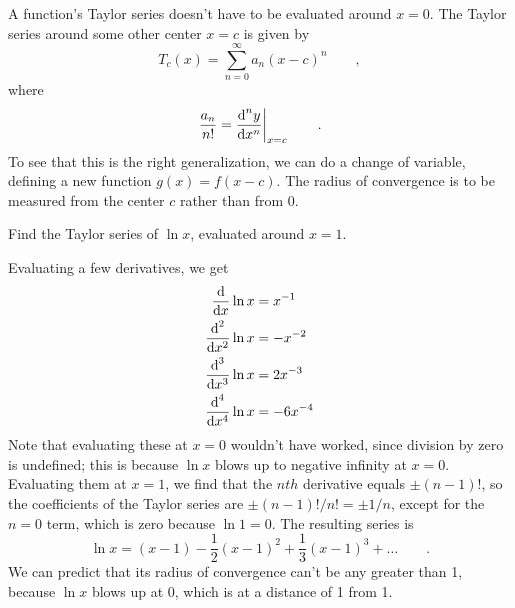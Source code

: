 A function's Taylor series doesn't have to be evaluated around $x=0$. The Taylor series around some other
center $x=c$ is given by
\begin{equation*}
  T_c(x) = \sum_{n=0}^\infty a_n (x-c)^n \qquad ,
\end{equation*}
where 
\begin{equation*}
  \left. \frac{a_n}{n!} = \frac{\textup{d}^n y}{\textup{d} x^n}\right|_{x=c} \qquad .
\end{equation*}
To see that this is the right generalization, we can do a change of variable,
defining a new function $g(x)=f(x-c)$. The radius of convergence is to be measured
from the center $c$ rather than from 0.

\begin{eg}
\egquestion
Find the Taylor series of $\ln x$, evaluated around $x=1$.

\eganswer
Evaluating a few derivatives, we get
\begin{align*}
  \frac{\textup{d}}{\textup{d} x}\ln x &= x^{-1} \\
  \frac{\textup{d}^2}{\textup{d} x^2}\ln x &= -x^{-2}\\
  \frac{\textup{d}^3}{\textup{d} x^3}\ln x &= 2x^{-3}\\
  \frac{\textup{d}^4}{\textup{d} x^4}\ln x &= -6x^{-4}
\end{align*}
Note that evaluating these at $x=0$ wouldn't have worked, since division by zero is undefined;
this is because $\ln x$ blows up to negative infinity at $x=0$. Evaluating them at $x=1$, we
find that the $nth$ derivative equals $\pm (n-1)!$, so the coefficients of the Taylor
series are $\pm (n-1)!/n!=\pm1/n$, except for the $n=0$ term, which is zero because
$\ln 1=0$. The resulting series is
\begin{equation*}
  \ln x = (x-1) - \frac{1}{2}(x-1)^2 + \frac{1}{3}(x-1)^3 + \ldots \qquad .
\end{equation*}
We can predict that its radius of convergence can't be any greater than 1, because
$\ln x$ blows up at 0, which is at a distance of 1 from 1.
\end{eg}

